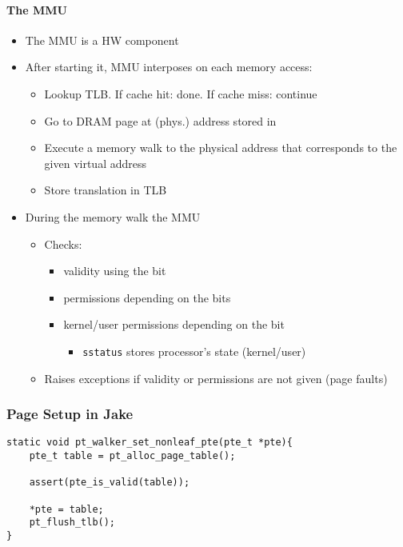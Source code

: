 \paragraph{The MMU}
\begin{itemize}
    \item The MMU is a HW component
    \item After starting it, MMU interposes on each memory access:
          \begin{itemize}
              \item Lookup TLB. If cache hit: done. If cache miss: continue
              \item Go to DRAM page at (phys.) address stored in 
              \item Execute a memory walk to the physical address that corresponds to the given virtual address
              \item Store translation in TLB
          \end{itemize}
    \item During the memory walk the MMU
          \begin{itemize}
              \item Checks:
                    \begin{itemize}
                        \item validity using the  bit
                        \item permissions depending on the  bits
                        \item kernel/user permissions depending on the  bit
                              \begin{itemize}
                                  \item \texttt{sstatus} stores processor's state (kernel/user)
                              \end{itemize}
                    \end{itemize}
              \item Raises exceptions if validity or permissions are not given (page faults)
          \end{itemize}
\end{itemize}

\subsubsection{Page Setup in Jake}

\newpar{}
\begin{lstlisting}[style=bright_C++]
static void pt_walker_set_nonleaf_pte(pte_t *pte){
    pte_t table = pt_alloc_page_table();

    assert(pte_is_valid(table));

    *pte = table;
    pt_flush_tlb();
}
\end{lstlisting}

